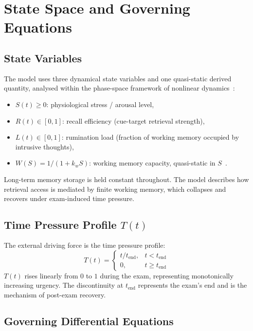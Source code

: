 \section{State Space and Governing Equations}
\label{sec:model}

\subsection{State Variables}

The model uses three dynamical state variables and one quasi-static
derived quantity, analysed within the phase-space framework of
nonlinear dynamics~\cite{strogatz2018}:
\begin{itemize}
  \item $S(t) \geq 0$: physiological stress / arousal level,
  \item $R(t) \in [0,1]$: recall efficiency (cue\allowbreak-\allowbreak target retrieval strength),
  \item $L(t) \in [0,1]$: rumination load (fraction of working
    memory occupied by intrusive thoughts),
  \item $W(S) = 1/(1+k_w S)$: working memory capacity, quasi-static
    in $S$~\cite{baddeley1986}.
\end{itemize}
Long-term memory storage is held constant throughout. The model
describes how retrieval access is mediated by finite working
memory, which collapses and recovers under exam-induced time pressure.

\subsection{Time Pressure Profile \texorpdfstring{$T(t)$}{T(t)}}

The external driving force is the time pressure profile:
\begin{equation}
  T(t) =
  \begin{cases}
    t/t_{\mathrm{end}}, & t < t_{\mathrm{end}} \\[4pt]
    0,                  & t \geq t_{\mathrm{end}}
  \end{cases}
  \label{eq:T}
\end{equation}
$T(t)$ rises linearly from $0$ to $1$ during the exam, representing
monotonically increasing urgency. The discontinuity at
$t_{\mathrm{end}}$ represents the exam's end and is the mechanism
of post-exam recovery.

\subsection{Governing Differential Equations}

